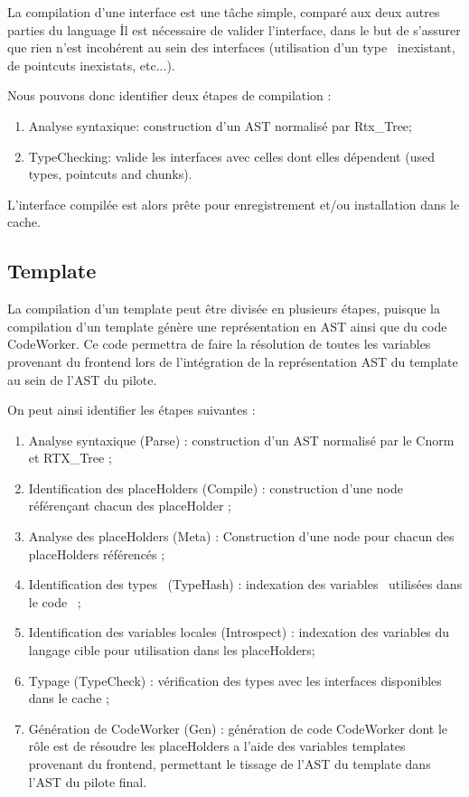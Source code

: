 \documentclass[french]{rtxreport}
\begin{document}
La compilation d'une interface est une tâche simple, comparé aux deux autres
parties du language \rtx\. Il est nécessaire de valider l'interface, dans le
but de s'assurer que rien n'est incohérent au sein des interfaces (utilisation
d'un type \rtx\ inexistant, de pointcuts inexistats, etc...).

Nous pouvons donc identifier deux étapes de compilation :
\begin{enumerate}
    \item Analyse syntaxique: construction d'un AST normalisé par Rtx\_Tree;
    \item TypeChecking: valide les interfaces avec celles dont elles dépendent
        (used types, pointcuts and chunks).
\end{enumerate}

L'interface compilée est alors prête pour enregistrement et/ou installation
dans le cache.

\subsection{Template}

La compilation d'un template peut être divisée en plusieurs étapes, puisque la
compilation d'un template génère une représentation en AST ainsi que du code
CodeWorker. Ce code permettra de faire la résolution de toutes les variables
provenant du frontend lors de l'intégration de la représentation AST du
template au sein de l'AST du pilote.

On peut ainsi identifier les étapes suivantes :
\begin{enumerate}
    \item Analyse syntaxique (Parse) : construction d'un AST normalisé par le
        Cnorm et RTX\_Tree ;
    \item Identification des placeHolders (Compile) : construction d'une node
        référençant chacun des placeHolder ;
    \item Analyse des placeHolders (Meta) : Construction d'une node pour chacun
        des placeHolders référencés ;
    \item Identification des types \rtx\ (TypeHash) : indexation des
        variables \rtx\ utilisées dans le code \rtx\ ;
    \item Identification des variables locales (Introspect) : indexation
        des variables du langage cible pour utilisation dans les placeHolders;
    \item Typage (TypeCheck) : vérification des types avec les interfaces
        disponibles dans le cache ;
    \item Génération de CodeWorker (Gen) : génération de code CodeWorker dont
        le rôle est de résoudre les placeHolders a l'aide des variables
        templates provenant du frontend, permettant le tissage de l'AST du
        template dans l'AST du pilote final.
\end{enumerate}
\end{document}
